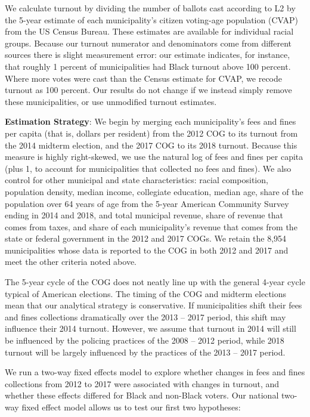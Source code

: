 \documentclass[
  12pt,
]{article}
\begin{document}
We calculate turnout by dividing the number of ballots cast according to L2 by the 5-year estimate of each municipality's citizen voting-age population (CVAP) from the US Census Bureau. These estimates are available for individual racial groups. Because our turnout numerator and denominators come from different sources there is slight measurement error: our estimate indicates, for instance, that roughly 1 percent of municipalities had Black turnout above 100 percent. Where more votes were cast than the Census estimate for CVAP, we recode turnout as 100 percent. Our results do not change if we instead simply remove these municipalities, or use unmodified turnout estimates.

\textbf{Estimation Strategy}: We begin by merging each municipality's fees and fines per capita (that is, dollars per resident) from the 2012 COG to its turnout from the 2014 midterm election, and the 2017 COG to its 2018 turnout. Because this measure is highly right-skewed, we use the natural log of fees and fines per capita (plus 1, to account for municipalities that collected no fees and fines). We also control for other municipal and state characteristics: racial composition, population density, median income, collegiate education, median age, share of the population over 64 years of age from the 5-year American Community Survey ending in 2014 and 2018, and total municipal revenue, share of revenue that comes from taxes, and share of each municipality's revenue that comes from the state or federal government in the 2012 and 2017 COGs. We retain the 8,954 municipalities whose data is reported to the COG in both 2012 and 2017 and meet the other criteria noted above.

The 5-year cycle of the COG does not neatly line up with the general 4-year cycle typical of American elections. The timing of the COG and midterm elections mean that our analytical strategy is conservative. If municipalities shift their fees and fines collections dramatically over the 2013 -- 2017 period, this shift may influence their 2014 turnout. However, we assume that turnout in 2014 will still be influenced by the policing practices of the 2008 -- 2012 period, while 2018 turnout will be largely influenced by the practices of the 2013 -- 2017 period.

We run a two-way fixed effects model to explore whether changes in fees and fines collections from 2012 to 2017 were associated with changes in turnout, and whether these effects differed for Black and non-Black voters. Our national two-way fixed effect model allows us to test our first two hypotheses:
\end{document}
